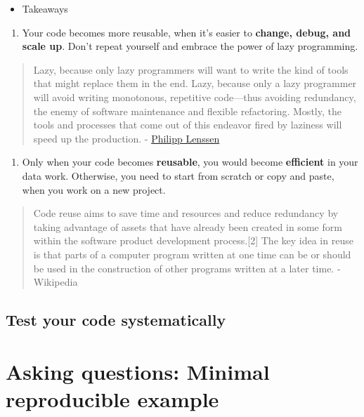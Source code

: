 \documentclass[
]{book}
\providecommand{\tightlist}{%
  \setlength{\itemsep}{0pt}\setlength{\parskip}{0pt}}
\begin{document}
\begin{itemize}
\tightlist
\item
  Takeaways
\end{itemize}

\begin{enumerate}
\def\labelenumi{\arabic{enumi}.}
\tightlist
\item
  Your code becomes more reusable, when it's easier to \textbf{change, debug, and scale up}. Don't repeat yourself and embrace the power of lazy programming.
\end{enumerate}

\begin{quote}
Lazy, because only lazy programmers will want to write the kind of tools that might replace them in the end. Lazy, because only a lazy programmer will avoid writing monotonous, repetitive code---thus avoiding redundancy, the enemy of software maintenance and flexible refactoring. Mostly, the tools and processes that come out of this endeavor fired by laziness will speed up the production. - \href{http://blogoscoped.com/archive/2005-08-24-n14.html}{Philipp Lenssen}
\end{quote}

\begin{enumerate}
\def\labelenumi{\arabic{enumi}.}
\setcounter{enumi}{1}
\tightlist
\item
  Only when your code becomes \textbf{reusable}, you would become \textbf{efficient} in your data work. Otherwise, you need to start from scratch or copy and paste, when you work on a new project.
\end{enumerate}

\begin{quote}
Code reuse aims to save time and resources and reduce redundancy by taking advantage of assets that have already been created in some form within the software product development process.{[}2{]} The key idea in reuse is that parts of a computer program written at one time can be or should be used in the construction of other programs written at a later time. - Wikipedia
\end{quote}

\hypertarget{test-your-code-systematically}{%
\subsection{Test your code systematically}\label{test-your-code-systematically}}

\hypertarget{asking-questions-minimal-reproducible-example}{%
\section{Asking questions: Minimal reproducible example}\label{asking-questions-minimal-reproducible-example}}
\end{document}
